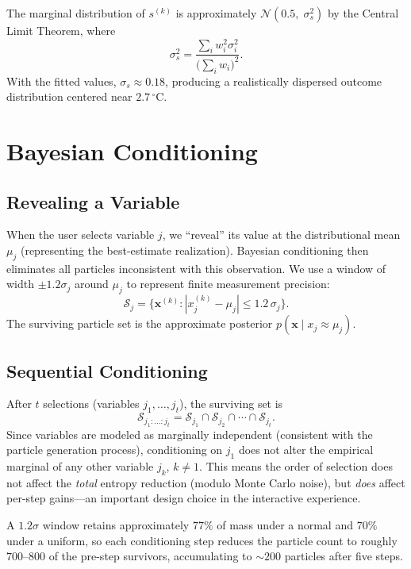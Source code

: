 \documentclass[10pt,twocolumn]{article}
\begin{document}
The marginal distribution of $s^{(k)}$ is approximately
$\mathcal{N}(0.5,\; \sigma_s^2)$ by the Central Limit Theorem,
where
\[
  \sigma_s^2 = \frac{\sum_i w_i^2 \sigma_i^2}{\bigl(\sum_i w_i\bigr)^2}.
\]
With the fitted values, $\sigma_s \approx 0.18$, producing a
realistically dispersed outcome distribution centered near $2.7\,^\circ$C.

\section{Bayesian Conditioning}

\subsection{Revealing a Variable}

When the user selects variable $j$, we ``reveal'' its value at the
distributional mean $\mu_j$ (representing the best-estimate realization).
Bayesian conditioning then eliminates all particles inconsistent with
this observation.  We use a window of width $\pm 1.2\sigma_j$ around
$\mu_j$ to represent finite measurement precision:
\[
  \mathcal{S}_j = \bigl\{\mathbf{x}^{(k)} : |x_j^{(k)} - \mu_j| \le 1.2\,\sigma_j\bigr\}.
\]
The surviving particle set is the approximate posterior
$p(\mathbf{x} \mid x_j \approx \mu_j)$.

\subsection{Sequential Conditioning}

After $t$ selections (variables $j_1,\ldots,j_t$), the surviving set is
\[
  \mathcal{S}_{j_1:\ldots:j_t}
    = \mathcal{S}_{j_1} \cap \mathcal{S}_{j_2} \cap \cdots \cap \mathcal{S}_{j_t}.
\]
Since variables are modeled as marginally independent (consistent with
the particle generation process), conditioning on $j_1$ does not alter
the empirical marginal of any other variable $j_k$, $k\neq 1$.
This means the order of selection does not affect the \emph{total}
entropy reduction (modulo Monte Carlo noise), but \emph{does} affect
per-step gains---an important design choice in the interactive experience.

A $1.2\sigma$ window retains approximately $77\%$ of mass under a
normal and $70\%$ under a uniform, so each conditioning step reduces
the particle count to roughly $700$--$800$ of the pre-step survivors,
accumulating to $\sim\!200$ particles after five steps.
\end{document}
